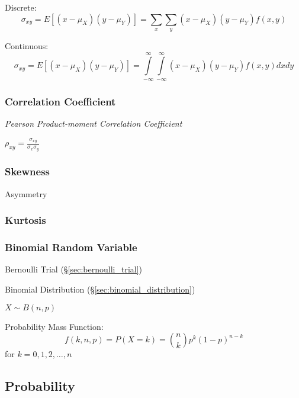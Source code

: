 Discrete:
\[
  \sigma_{xy} = E [(x - \mu_X)(y - \mu_Y)] = \sum_x \sum_y (x - \mu_X)
  (y - \mu_Y) f(x,y)
\]

Continuous:
\[
  \sigma_{xy} = E [(x - \mu_X)(y - \mu_Y)] =
  \int\limits_{-\infty}^{\infty} \int\limits_{-\infty}^{\infty}
  (x - \mu_X) (y - \mu_Y) f(x,y) dx dy
\]



\subsubsection{Correlation Coefficient}
\label{sec:correlation_coefficient}

\emph{Pearson Product-moment Correlation Coefficient}

$\rho_{xy} = \frac{\sigma_{xy}}{\sigma_x \sigma_y}$



\subsubsection{Skewness}\label{sec:skewness}

Asymmetry %



\subsubsection{Kurtosis}\label{sec:kurtosis}

\subsubsection{Binomial Random Variable}
\label{sec:binomial_random_variable}

Bernoulli Trial (\S\ref{sec:bernoulli_trial})

Binomial Distribution (\S\ref{sec:binomial_distribution})

$X \sim B(n,p)$

Probability Mass Function:
\[
  f(k,n,p) = P(X = k) = \binom{n}{k} p^k (1-p)^{n-k}
\]
for $k = 0,1,2, \ldots, n$



\subsection{Probability}\label{sec:probability}

